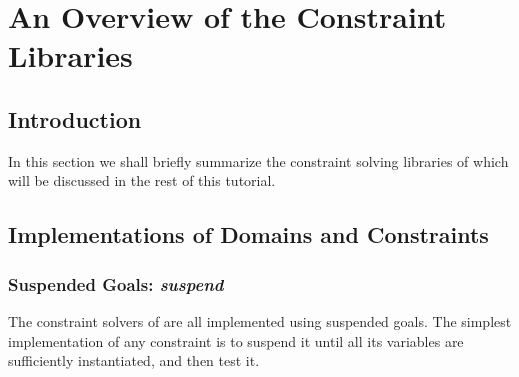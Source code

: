 %
% 
% 
% 
% 

\chapter{An Overview of the Constraint Libraries}

\section{Introduction}
In this section we shall briefly summarize the constraint solving
libraries of \eclipse which will be discussed in the rest of this tutorial.


\section{Implementations of Domains and Constraints}

\subsection{Suspended Goals: {\em suspend}}
\label{shortsecsuspend}
The constraint solvers of { \eclipse } are all implemented using suspended
goals.
The simplest implementation of any constraint is to suspend it
until all its variables are sufficiently instantiated, and then test it.

